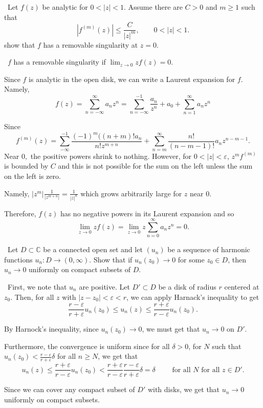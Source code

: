 \documentclass[12pt]{Homework}
\begin{document}
\begin{problem} $\,$
Let $f(z)$ be analytic for $0<|z|<1$. Assume there are $C>0$ and $m\ge1$ such that $$|f^{(m)}(z)|\le\frac{C}{|z|^m},\qquad 0<|z|<1.$$ show that $f$ has a removable singularity at $z=0.$
\end{problem}


\begin{solution}$\,$
$f$ has a removable singularity if $\lim_{z\to0}zf(z)=0.$

Since $f$ is analytic in the open disk, we can write a Laurent expansion for $f$. Namely, $$f(z)=\sum_{n=-\infty}^\infty a_nz^n=\sum_{n=-\infty}^{-1}\frac{a_n}{z^n}+a_0+\sum_{n=1}^\infty a_nz^n$$

Since $$f^{(m)}(z)=\sum_{-\infty}^{-1}\frac{(-1)^m((n+m)!a_n}{n!z^{m+n}}+\sum_{n=m}^\infty\frac{n!}{(n-m-1)!}a_nz^{n-m-1}.$$ Near $0,$ the positive powers shrink to nothing. However, for $0<|z|<\varepsilon$, $z^mf^{(m)}$ is bounded by $C$ and this is not possible for the sum on the left unless the sum on the left is zero.

Namely, $|z^m|\frac{1}{|z^{m+n}|}=\frac{1}{|z|^n}$ which grows arbitrarily large for $z$ near $0.$

Therefore, $f(z)$ has no negative powers in its Laurent expansion and so $$\lim_{z\to0}zf(z)=\lim_{z\to0}z\sum_{n=0}^\infty a_nz^n=0.$$

\end{solution}
\newpage



\begin{problem} $\,$
Let $D\subset\mathbb{C}$ be a connected open set and let $(u_n)$ be a sequence of harmonic functions $u_n:D\to(0,\infty).$ Show that if $u_n(z_0)\to0$ for some $z_0\in D$, then $u_n\to0$ uniformly on compact subsets of $D.$
\end{problem}


\begin{solution}$\,$
First, we note that $u_n$ are positive. Let $D'\subset D$ be a disk of radius $r$ centered at $z_0$. Then, for all $z$ with $|z-z_0|<\varepsilon<r$, we can apply Harnack's inequality to get $$\frac{r-\varepsilon}{r+\varepsilon}u_n(z_0)\le u_n(z)\le\frac{r+\varepsilon}{r-\varepsilon}u_n(z_0).$$

By Harnock's inequality, since $u_n(z_0)\to 0$, we must get that $u_n\to0$ on $D'.$

Furthermore, the convergence is uniform since for all $\delta>0$, for $N$ such that $u_n(z_0)< \frac{r-\varepsilon}{r+\varepsilon}\delta$ for all $n\ge N$, we get that $$u_n(z)\le\frac{r+\varepsilon}{r-\varepsilon}u_n(z_0)<\frac{r+\varepsilon}{r-\varepsilon}\frac{r-\varepsilon}{r+\varepsilon}\delta=\delta\qquad\text{ for all }N\text{ for all }z\in D'.$$

Since we can cover any compact subset of $D'$ with disks, we get that $u_n\to0$ uniformly on compact subsets.
\end{solution}
\newpage
\end{document}
